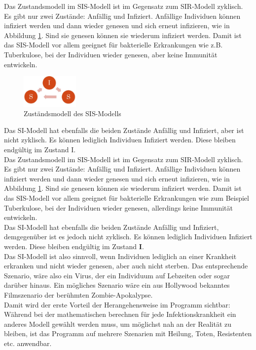 Das Zustandsmodell im SIS-Modell ist im Gegensatz zum SIR-Modell zyklisch. Es gibt nur zwei Zustände: Anfällig und Infiziert. Anfällige Individuen können infiziert werden und dann wieder genesen und sich erneut infizieren, wie in Abbildung \ref{fig:sis}. Sind sie genesen können sie wiederum infiziert werden. Damit ist das SIS-Modell vor allem geeignet für bakterielle Erkrankungen wie z.B. Tuberkulose, bei der Individuen wieder genesen, aber keine Immunität entwickeln. 
\begin{figure}[H]
	\centering
	\includegraphics[width= 0.25\textwidth]{./images/SIS-Modell.jpg}\caption{Zuständsmodell des SIS-Modells}\label{fig:sis}
\end{figure}
Das SI-Modell hat ebenfalls die beiden Zustände Anfällig und Infiziert, aber ist nicht zyklisch. Es können lediglich Individuen Infiziert werden. Diese bleiben endgültig im Zustand I.\\ 

Das Zustandsmodell im SIS-Modell ist im Gegensatz zum SIR-Modell zyklisch. Es gibt nur zwei Zustände: Anfällig und Infiziert. Anfällige Individuen können infiziert werden und dann wieder genesen und sich erneut infizieren, wie in Abbildung \ref{fig:sis}. Sind sie genesen können sie wiederum infiziert werden. Damit ist das SIS-Modell vor allem geeignet für bakterielle Erkrankungen wie zum Beispiel Tuberkulose, bei der Individuen wieder genesen, allerdings keine Immunität entwickeln. \\
Das SI-Modell hat ebenfalls die beiden Zustände Anfällig und Infiziert, demgegenüber ist es jedoch nicht zyklisch. Es können lediglich Individuen Infiziert werden. Diese bleiben endgültig im Zustand \textbf{I}.\\ 

Das SI-Modell ist also sinnvoll, wenn Individuen lediglich an einer Krankheit erkranken und nicht wieder genesen, aber auch nicht sterben. Das entsprechende Szenario, wäre also ein Virus, der ein Individuum auf Lebzeiten oder sogar darüber hinaus. Ein mögliches Szenario wäre ein aus Hollywood bekanntes Filmszenario der berühmten Zombie-Apokalypse.\\
Damit wird der erste Vorteil der Herangehensweise im Programm sichtbar: Während bei der mathematischen berechnen für jede Infektionskrankheit ein anderes Modell gewählt werden muss, um möglichst nah an der Realität zu bleiben, ist das Programm auf mehrere Szenarien mit Heilung, Toten, Resistenten etc. anwendbar.